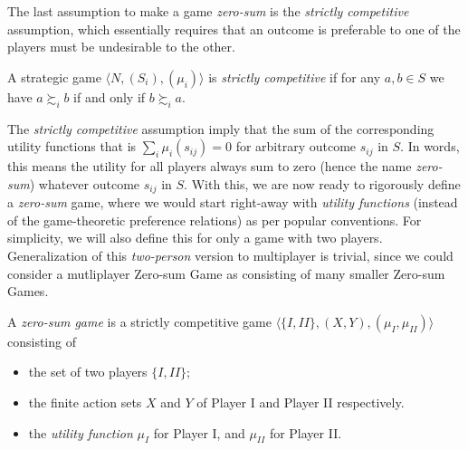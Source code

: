 \documentclass[journal, 11pt, a4paper, twoside]{IEEEtran}
\begin{document}
The last assumption to make a game \textit{zero-sum} is the \textit{strictly competitive} assumption, which essentially requires that an outcome is preferable to one of the players must be undesirable to the other. 
\begin{definition}
    A strategic game $\langle N, (S_i), (\mu_i) \rangle$ is \textit{strictly competitive} if for any $a, b \in S$ we have $a \succsim_i b$ if and only if $b \succsim_i a$. 
\end{definition}
\noindent The \textit{strictly competitive} assumption imply that the sum of the corresponding utility functions that is $\sum_i \mu_i(s_{ij}) = 0$ for arbitrary outcome $s_{ij}$ in $S$. In words, this means the utility for all players always sum to zero (hence the name \textit{zero-sum}) whatever outcome $s_{ij}$ in $S$. With this, we are now ready to rigorously define a \textit{zero-sum} game, where we would start right-away with \textit{utility functions} (instead of the game-theoretic preference relations) as per popular conventions. For simplicity, we will also define this for only a game with two players. Generalization of this \textit{two-person} version to multiplayer is trivial, since we could consider a mutliplayer Zero-sum Game as consisting of many smaller Zero-sum Games.
\begin{definition}
    A \textit{zero-sum game} is a strictly competitive game $\langle \{I, II\}, (X,Y), (\mu_I, \mu_{II}) \rangle$ consisting of
    \begin{itemize}
    \item the set of two players \(\{I, II\}\);
    \item the finite action sets $X$ and $Y$ of Player I and Player II respectively.
    \item the \textit{utility function} $\mu_I$ for Player I, and $\mu_{II}$ for Player II.
\end{itemize}
\end{definition}
\end{document}
